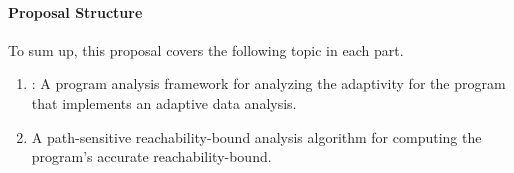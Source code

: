 \paragraph*{Proposal Structure}
To sum up, this proposal covers the following topic in each part.
\begin{enumerate}
 \item {}: A program analysis framework for analyzing the adaptivity for the program that implements an adaptive data analysis.
 \item {} A path-sensitive reachability-bound analysis algorithm for computing the program's accurate reachability-bound.
\end{enumerate}
